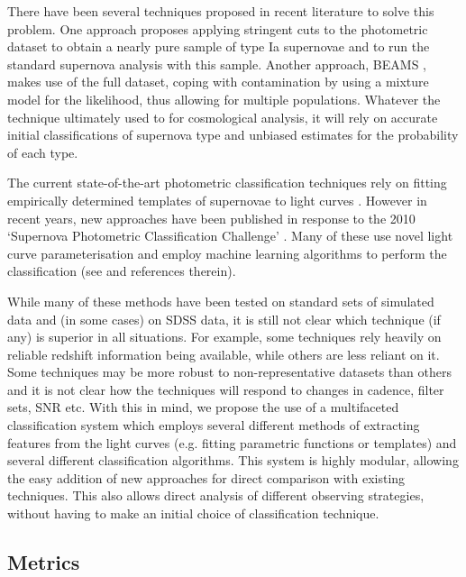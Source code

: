 There have been several techniques proposed in recent literature to solve this problem. One 
approach proposes applying stringent cuts to the photometric dataset to obtain a nearly pure sample 
of type Ia supernovae \citep{Bernstein2012,Campbell2013} and to run the standard supernova analysis 
with this sample. Another approach, BEAMS \citep{Kunz2007,Newling2011,Hlozek2012,Knights2013}, 
makes use of the full dataset, coping with contamination by using a mixture model for the 
likelihood, thus allowing for multiple populations. Whatever the technique ultimately used to for 
cosmological analysis, it will rely on accurate initial classifications of supernova type and 
unbiased estimates for the probability of each type.

The current state-of-the-art photometric classification techniques rely on fitting empirically 
determined templates of supernovae to light curves \citep{Jha2007,Guy2007,Sako2011}. However in 
recent years, new approaches have been published in response to the 2010 `Supernova 
Photometric Classification Challenge' \citep{Kessler2010a}. Many of these use novel light curve 
parameterisation and employ machine learning algorithms to perform the classification (see 
\citet{Kessler2010b} and references therein).

While many of these methods have been tested on standard sets of simulated data and (in some cases) 
on SDSS data, it is still not clear which technique (if any) is superior in all situations. For 
example, some techniques rely heavily on reliable redshift information being available, while others 
are less reliant on it. Some techniques may be more robust to non-representative datasets than 
others and it is not clear how the techniques will respond to changes in cadence, filter sets, SNR 
etc. With this in mind, we propose the use of a multifaceted classification system which employs 
several different methods of extracting features from the light curves (e.g. fitting parametric 
functions or templates) and several different classification algorithms. This system is highly 
modular, allowing the easy addition of new approaches for direct comparison with existing 
techniques. This also allows direct analysis of different observing strategies, without having to 
make an initial choice of classification technique. 




\subsection{Metrics}
\label{sec:keyword:metrics}

